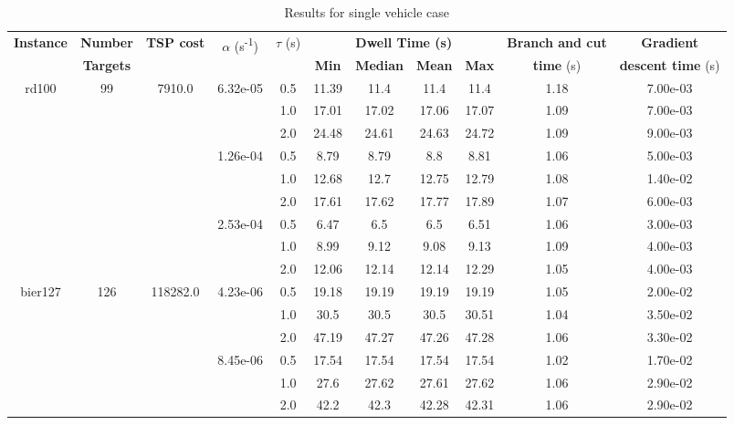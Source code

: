 \begin{table*}[htb!]
\centering
\caption{Results for single vehicle case}
\label{tab: single_vehicle_results}	\begin{tabular}{|c|c|c|c|c|c|c|c|c|c|c|}
	\hline
\multirow{2}{*}{\textbf{Instance}} &\textbf{Number} &\multirow{2}{*}{\textbf{TSP cost}} &\multirow{2}{*}{$\alpha$ (s\textsuperscript{-1})} &\multirow{2}{*}{$\tau$ (s)} &\multicolumn{4}{c|}{\textbf{Dwell Time (s)}}&\textbf{Branch and cut} &\textbf{Gradient}\\
\cline{6-9}
& {\textbf{Targets}} & & & & \textbf{Min}& \textbf{Median}& \textbf{Mean}& \textbf{Max} & \textbf{time} (s) & \textbf{descent time} (s) \\


\hline
 	\multirow{9}{*}{rd100} & \multirow{9}{*}{99} & \multirow{9}{*}{7910.0} & \multirow{3}{*}{6.32e-05} & 0.5 & 11.39 & 11.4 & 11.4 & 11.4 & 1.18 & 7.00e-03 \\
	& & & & 1.0 & 17.01 & 17.02 & 17.06 & 17.07 & 1.09 & 7.00e-03 \\
	& & & & 2.0 & 24.48 & 24.61 & 24.63 & 24.72 & 1.09 & 9.00e-03 \\

\cline{4-11}
	& & &\multirow{3}{*}{1.26e-04} & 0.5 & 8.79 & 8.79 & 8.8 & 8.81 & 1.06 & 5.00e-03 \\
	& & & & 1.0 & 12.68 & 12.7 & 12.75 & 12.79 & 1.08 & 1.40e-02 \\
	& & & & 2.0 & 17.61 & 17.62 & 17.77 & 17.89 & 1.07 & 6.00e-03 \\

\cline{4-11}
	& & &\multirow{3}{*}{2.53e-04} & 0.5 & 6.47 & 6.5 & 6.5 & 6.51 & 1.06 & 3.00e-03 \\
	& & & & 1.0 & 8.99 & 9.12 & 9.08 & 9.13 & 1.09 & 4.00e-03 \\
	& & & & 2.0 & 12.06 & 12.14 & 12.14 & 12.29 & 1.05 & 4.00e-03 \\

\hline
 	\multirow{9}{*}{bier127} & \multirow{9}{*}{126} & \multirow{9}{*}{118282.0} & \multirow{3}{*}{4.23e-06} & 0.5 & 19.18 & 19.19 & 19.19 & 19.19 & 1.05 & 2.00e-02 \\
	& & & & 1.0 & 30.5 & 30.5 & 30.5 & 30.51 & 1.04 & 3.50e-02 \\
	& & & & 2.0 & 47.19 & 47.27 & 47.26 & 47.28 & 1.06 & 3.30e-02 \\

\cline{4-11}
	& & &\multirow{3}{*}{8.45e-06} & 0.5 & 17.54 & 17.54 & 17.54 & 17.54 & 1.02 & 1.70e-02 \\
	& & & & 1.0 & 27.6 & 27.62 & 27.61 & 27.62 & 1.06 & 2.90e-02 \\
	& & & & 2.0 & 42.2 & 42.3 & 42.28 & 42.31 & 1.06 & 2.90e-02 \\


\end{tabular}
\end{table*}
